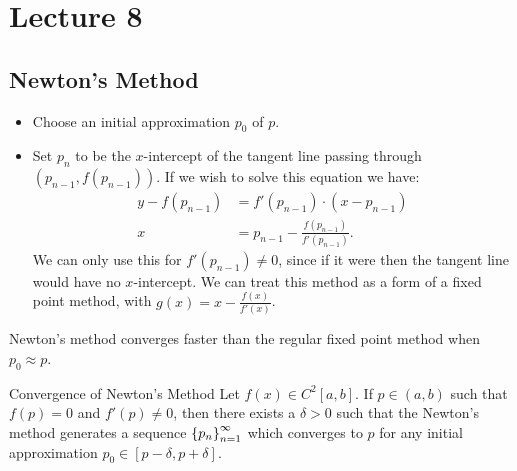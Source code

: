 \documentclass[class=article, crop=false]{standalone}
\begin{document}
  \section{Lecture 8}
  \subsection{Newton's Method}
  \begin{itemize}
    \item Choose an initial approximation $p_0$ of $p$.
    \item Set $p_n$ to be the $x$-intercept of the tangent line passing through $(p_{n - 1}, f(p_{n - 1}))$. If we wish to solve this equation we have:
    \begin{align*}
      y - f(p_{n - 1}) &= f'(p_{n - 1})\cdot (x - p_{n - 1}) \\
      x &= p_{n - 1} - \frac{f(p_{n - 1})}{f'(p_{n - 1})}.
    \end{align*}
    We can only use this for $f'(p_{n - 1})\neq 0$, since if it were then the tangent line would have no $x$-intercept. We can treat this method as a form of a fixed point method, with $g(x) = x - \frac{f(x)}{f'(x)}$.
  \end{itemize}
  \begin{note}{}
    Newton's method converges faster than the regular fixed point method when $p_0\approx p$.
  \end{note}
  \begin{theorem}{Convergence of Newton's Method}
    Let $f(x)\in C^2[a, b]$. If $p\in (a, b)$ such that $f(p) = 0$ and $f'(p)\neq 0$, then there exists a $\delta > 0$ such that the Newton's method generates a sequence $\left\{p_n\right\}_{n = 1}^\infty$ which converges to $p$ for any initial approximation $p_0\in [p - \delta, p + \delta]$.
  \end{theorem}
\end{document}
